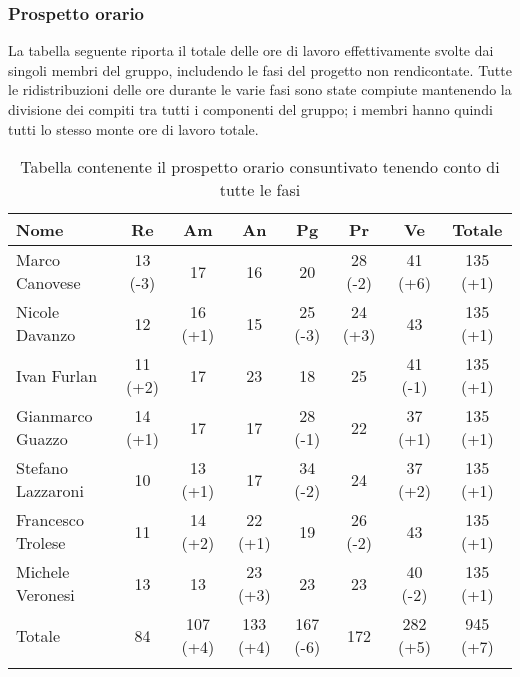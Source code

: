 \subsubsection{Prospetto orario}
La tabella seguente riporta il totale delle ore di lavoro effettivamente svolte dai singoli membri del gruppo, includendo le fasi del progetto non rendicontate. Tutte le ridistribuzioni delle ore durante le varie fasi sono state compiute mantenendo la divisione dei compiti tra tutti i componenti del gruppo; i membri hanno quindi tutti lo stesso monte ore di lavoro totale.

\begin{longtable}{|p{1.5cm}|c|c|c|c|c|c|c|}
	\hline
	\rowcolor{lighter-grayer}
	\textbf{Nome}     & \textbf{Re} & \textbf{Am} & \textbf{An} & \textbf{Pg} & \textbf{Pr} & \textbf{Ve} & \textbf{Totale} \\
	\hline
	\endfirsthead

	\hline
	Marco Canovese    & 13 (-3)         & 17          & 16          & 20          & 28 (-2)         & 41 (+6)         & 135 (+1)            \\
	\hline
	\hline
	Nicole Davanzo    & 12          & 16 (+1)         & 15          & 25 (-3)          & 24 (+3)         & 43          & 135 (+1)            \\
	\hline
	\hline
	Ivan Furlan       & 11 (+2)         & 17          & 23          & 18          & 25          & 41 (-1)         & 135 (+1)            \\
	\hline
	\hline
	Gianmarco Guazzo  & 14 (+1)         & 17          & 17          & 28 (-1)         & 22          & 37 (+1)         & 135 (+1)            \\
	\hline
	\hline
	Stefano Lazzaroni & 10         & 13 (+1)         & 17          & 34 (-2)         & 24          & 37 (+2)         & 135 (+1)            \\
	\hline
	\hline
	Francesco Trolese & 11          & 14 (+2)         & 22 (+1)         & 19          & 26 (-2)         & 43          & 135 (+1)            \\
	\hline
	\hline
	Michele Veronesi  & 13          & 13          & 23 (+3)         & 23          & 23          & 40 (-2)         & 135 (+1)            \\
	\hline
	\hline
	Totale            & 84          & 107 (+4)        & 133 (+4)        & 167 (-6)        & 172        & 282 (+5)         & 945 (+7)            \\
	\hline
	\rowcolor{white}
	\caption{Tabella contenente il prospetto orario consuntivato tenendo conto di tutte le fasi}
\end{longtable}

